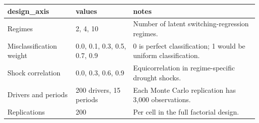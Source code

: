 \begin{tabular}{lll}
\toprule
design\_axis & values & notes \\
\midrule
Regimes & 2, 4, 10 & Number of latent switching-regression regimes. \\
Misclassification weight & 0.0, 0.1, 0.3, 0.5, 0.7, 0.9 & 0 is perfect classification; 1 would be uniform classification. \\
Shock correlation & 0.0, 0.3, 0.6, 0.9 & Equicorrelation in regime-specific drought shocks. \\
Drivers and periods & 200 drivers, 15 periods & Each Monte Carlo replication has 3,000 observations. \\
Replications & 200 & Per cell in the full factorial design. \\
\bottomrule
\end{tabular}

